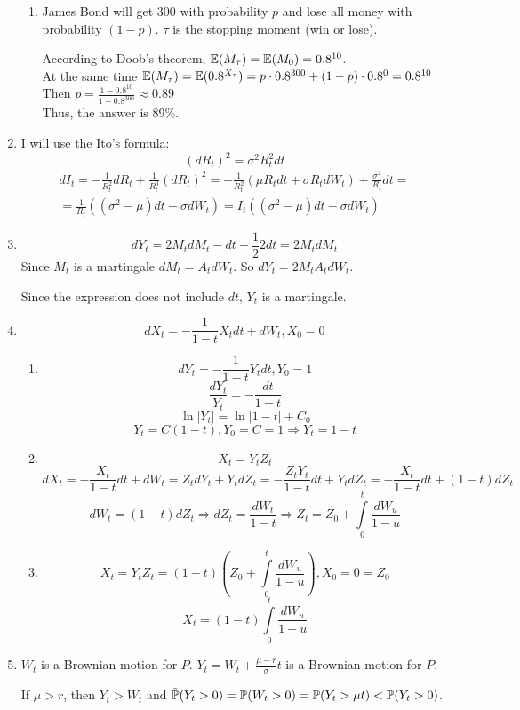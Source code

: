 \documentclass[12pt, a4paper]{article}
\begin{document}
\begin{enumerate}
\begin{enumerate}
\item James Bond will get 300 with probability $p$ and lose all money with probability $(1-p)$. $\tau$ is the stopping moment (win or lose).

According to Doob's theorem, $\E(M_{\tau})=\E(M_0)=0.8^{10}$.\\
At the same time $\E(M_{\tau})=\E(0.8^{X_{\tau}})=p\cdot 0.8^{300}+(1-p)\cdot 0.8^0=0.8^{10}$\\
Then $p=\frac{1-0.8^{10}}{1-0.8^{300}}\approx0.89$\\
Thus, the answer is 89\%.
\end{enumerate}

\item I will use the Ito's formula:
\[
(dR_t)^2=\sigma^2R_t^2dt
\]
\begin{multline}
dI_t=-\frac{1}{R_t^2}dR_t+\frac{1}{R_t^3} (dR_t)^2=-\frac{1}{R_t^2}(\mu R_t dt+\sigma R_tdW_t)+\frac{\sigma^2}{R_t}dt=\\
=\frac{1}{R_t}((\sigma^2-\mu)dt-\sigma dW_t)=I_t((\sigma^2-\mu)dt-\sigma dW_t)
\end{multline}

\item
\[
dY_t=2M_tdM_t-dt+\frac{1}{2}2dt=2M_tdM_t
\]
Since $M_t$ is a martingale $dM_t = A_t dW_t$. So $dY_t = 2M_t A_t dW_t$.

Since the expression does not include $dt$, $Y_t$ is  a martingale.

\item
\[
dX_t=-\frac{1}{1-t}X_tdt+dW_t,X_0=0
\]
\begin{enumerate}
\item
\[
dY_t=-\frac{1}{1-t}Y_tdt, Y_0=1
\]
\[
\frac{dY_t}{Y_t}=-\frac{dt}{1-t}
\]
\[
\ln|Y_t|=\ln|1-t|+C_0
\]
\[
Y_t=C(1-t), Y_0=C=1\Rightarrow Y_t=1-t
\]
\item
\[
X_t=Y_tZ_t
\]
\[
dX_t=-\frac{X_t}{1-t}dt+dW_t=Z_tdY_t+Y_tdZ_t=-\frac{Z_tY_t}{1-t}dt+Y_tdZ_t=-\frac{X_t}{1-t}dt+(1-t)dZ_t
\]
\[
dW_t=(1-t)dZ_t\Rightarrow dZ_t=\frac{dW_t}{1-t}\Rightarrow Z_t=Z_0+\int\limits_0^t \frac{dW_u}{1-u}
\]
\item
\[
X_t=Y_tZ_t=(1-t)\left(Z_0+\int\limits_0^t \frac{dW_u}{1-u}\right), X_0=0=Z_0
\]
\[
X_t=(1-t)\int\limits_0^t \frac{dW_u}{1-u}
\]
\end{enumerate}

\item
$W_t$ is a Brownian motion for $P$. $Y_t=W_t+\frac{\mu-r}{\sigma} t$ is a Brownian motion for $\tilde P$.

If $\mu>r$, then $Y_t>W_t$ and $\tilde \P(Y_t>0)=\P(W_t>0)=\P(Y_t>\mu t)<\P(Y_t>0)$.


\end{enumerate}
\end{document}
